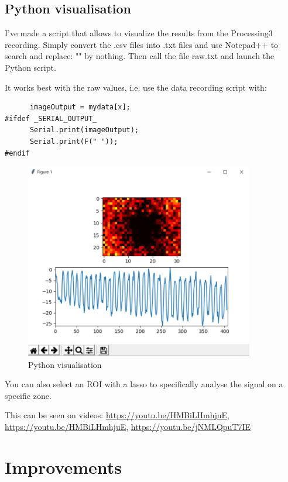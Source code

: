 \documentclass[a4paper]{article}
\begin{document}
\subsection{Python visualisation}
I've made a script that allows to visualize the results from the Processing3 recording. Simply convert the .csv files into .txt files and use Notepad++ to search and replace: "" by nothing. Then call the file raw.txt and launch the Python script.

It works best with the raw values, i.e. use the data recording script with:
\begin{lstlisting}
      imageOutput = mydata[x];
#ifdef _SERIAL_OUTPUT_
      Serial.print(imageOutput);
      Serial.print(F(" "));
#endif
\end{lstlisting}

\begin{figure}[h!]
    \centering
    \includegraphics[width = 10cm]{images/python.PNG}
    \caption{Python visualisation}
    \label{fig:python}
\end{figure}

You can also select an ROI with a lasso to specifically analyse the signal on a specific zone.

This can be seen on videos: \url{https://youtu.be/HMBiLHmhjuE}, \url{https://youtu.be/HMBiLHmhjuE}, \url{https://youtu.be/jNMLQpuT7IE}
\newpage

\section{Improvements}
\end{document}
